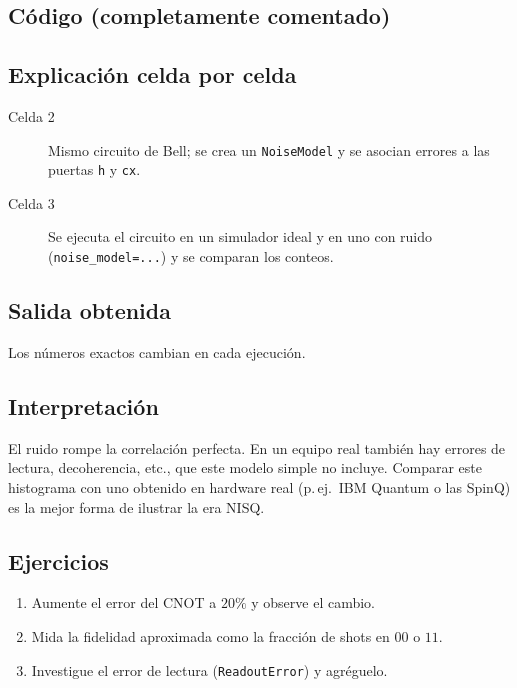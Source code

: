 \subsection{Código (completamente comentado)}


\subsection{Explicación celda por celda}
\begin{description}
  \item[Celda 2] Mismo circuito de Bell; se crea un \texttt{NoiseModel} y se
    asocian errores a las puertas \texttt{h} y \texttt{cx}.
  \item[Celda 3] Se ejecuta el circuito en un simulador ideal y en uno con
    ruido (\texttt{noise\_model=...}) y se comparan los conteos.
\end{description}

\subsection{Salida obtenida}

Los números exactos cambian en cada ejecución.

\subsection{Interpretación}
El ruido rompe la correlación perfecta. En un equipo real también hay errores
de lectura, decoherencia, etc., que este modelo simple no incluye. Comparar
este histograma con uno obtenido en hardware real (p.\,ej.\ IBM Quantum o las
SpinQ) es la mejor forma de ilustrar la era NISQ.

\subsection{Ejercicios}
\begin{enumerate}
  \item Aumente el error del CNOT a $20\%$ y observe el cambio.
  \item Mida la fidelidad aproximada como la fracción de shots en $00$ o $11$.
  \item Investigue el error de lectura (\texttt{ReadoutError}) y agréguelo.
\end{enumerate}


